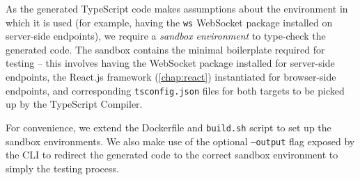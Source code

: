 As the generated TypeScript code makes assumptions about the
environment in which it is used (for example, having the \texttt{ws}
WebSocket package installed on server-side endpoints), we require a
\textit{sandbox environment} to type-check the generated code. 
The sandbox contains the minimal boilerplate required
for testing -- this involves having the WebSocket package installed
for server-side endpoints, the React.js framework (\cref{chap:react})
instantiated for browser-side endpoints,
and corresponding \texttt{tsconfig.json} files for both targets to
be picked up by the TypeScript Compiler.

For convenience, we extend the
Dockerfile and \texttt{build.sh} script 
to set up the sandbox environments. 
We also make use of the optional
\texttt{--output} flag exposed by the  CLI
to redirect the generated code to the correct sandbox environment
to simply the testing process.